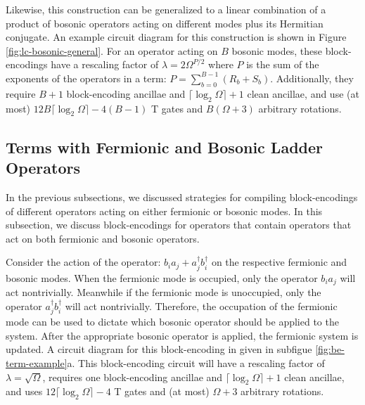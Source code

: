 Likewise, this construction can be generalized to a linear combination of a product of bosonic operators acting on different modes plus its Hermitian conjugate.
An example circuit diagram for this construction is shown in Figure \ref{fig:lc-bosonic-general}.
For an operator acting on $B$ bosonic modes, these block-encodings have a rescaling factor of $\lambda = 2 \Omega^{P/2}$ where $P$ is the sum of the exponents of the operators in a term: $P = \sum_{b=0}^{B-1}(R_b+S_b)$.
Additionally, they require $B+1$ block-encoding ancillae and $\lceil{\log_2{\Omega}}\rceil + 1$ clean ancillae, and use (at most)  $12B \lceil \log_2 \Omega \rceil - 4(B - 1)$ T gates and $B(\Omega + 3)$ arbitrary rotations.


\subsection{Terms with Fermionic and Bosonic Ladder Operators}

In the previous subsections, we discussed strategies for compiling block-encodings of different operators acting on either fermionic or bosonic modes.
In this subsection, we discuss block-encodings for operators that contain operators that act on both fermionic and bosonic operators.

\begin{figure*}
    
    
    
    \caption{
        \textbf{Block-Encoding Terms}
        In (a), a block-encoding for the operator $b_i^\dagger a_j^\dagger + a_j b_i$ is given.
        In (b), a block-encoding for the operator $ b_i^\dagger b_j^\dagger a_k^\dagger + a_k b_j b_i$ is given.
        In (c), a block-encoding for the operator $b_i^\dagger b_j^\dagger a_k^\dagger a_l^\dagger + a_l a_k b_j b_i$ is given.
    }
    \label{fig:be-term-example}
\end{figure*}


Consider the action of the operator: $b_i a_j + a_j^\dagger b_i^\dagger$ on the respective fermionic and bosonic modes.
When the fermionic mode is occupied, only the operator $b_i a_j$ will act nontrivially.
Meanwhile if the fermionic mode is unoccupied, only the operator $a_j^\dagger b_i^\dagger$ will act nontrivially.
Therefore, the occupation of the fermionic mode can be used to dictate which bosonic operator should be applied to the system.
After the appropriate bosonic operator is applied, the fermionic system is updated.
A circuit diagram for this block-encoding in given in subfigue \ref{fig:be-term-example}a.
This block-encoding circuit will have a rescaling factor of $\lambda = \sqrt{\Omega}$, requires one block-encoding ancillae and $\lceil \log_2\Omega \rceil + 1$ clean ancillae, and uses  $12 \lceil \log_2 \Omega \rceil - 4$ T gates and (at most) $\Omega + 3$ arbitrary rotations.

